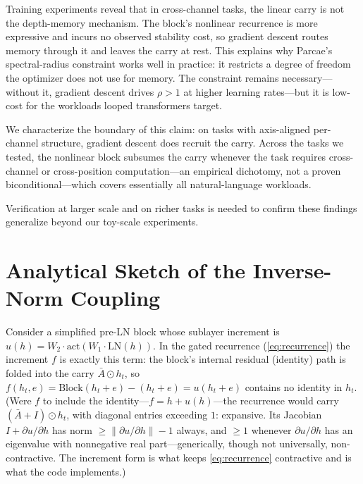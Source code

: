 \documentclass[11pt]{article}
\begin{document}
Training experiments reveal that in cross-channel tasks, the linear carry is not the depth-memory mechanism. The block's nonlinear recurrence is more expressive and incurs no observed stability cost, so gradient descent routes memory through it and leaves the carry at rest. This explains why Parcae's spectral-radius constraint works well in practice: it restricts a degree of freedom the optimizer does not use for memory. The constraint remains necessary---without it, gradient descent drives $\rho > 1$ at higher learning rates---but it is low-cost for the workloads looped transformers target.

We characterize the boundary of this claim: on tasks with axis-aligned per-channel structure, gradient descent does recruit the carry. Across the tasks we tested, the nonlinear block subsumes the carry whenever the task requires cross-channel or cross-position computation---an empirical dichotomy, not a proven biconditional---which covers essentially all natural-language workloads.

Verification at larger scale and on richer tasks is needed to confirm these findings generalize beyond our toy-scale experiments.


\appendix
\section{Analytical Sketch of the Inverse-Norm Coupling}
\label{app:coupling}

Consider a simplified pre-LN block whose sublayer increment is $u(h) = W_2 \cdot \text{act}(W_1 \cdot \text{LN}(h))$. In the gated recurrence (\cref{eq:recurrence}) the increment $f$ is exactly this term: the block's internal residual (identity) path is folded into the carry $\bar{A} \odot h_t$, so $f(h_t, e) = \text{Block}(h_t + e) - (h_t + e) = u(h_t + e)$ contains no identity in $h_t$. (Were $f$ to include the identity---$f = h + u(h)$---the recurrence would carry $(\bar{A} + I) \odot h_t$, with diagonal entries exceeding $1$: expansive. Its Jacobian $I + \partial u/\partial h$ has norm $\ge \|\partial u/\partial h\| - 1$ always, and $\ge 1$ whenever $\partial u/\partial h$ has an eigenvalue with nonnegative real part---generically, though not universally, non-contractive. The increment form is what keeps \cref{eq:recurrence} contractive and is what the code implements.)
\end{document}
